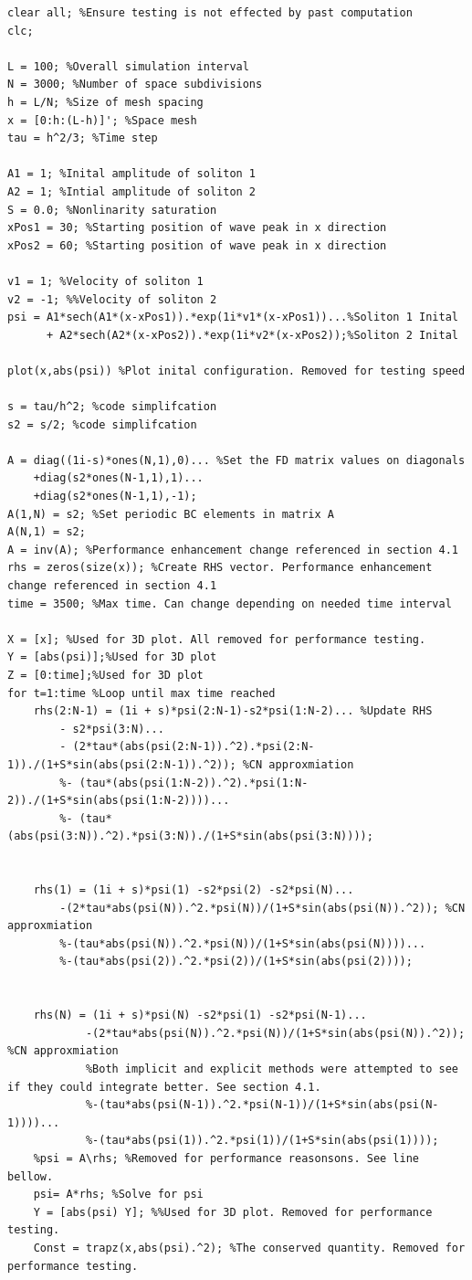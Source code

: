 \documentclass{article}
\begin{document}
\begin{lstlisting}
clear all; %Ensure testing is not effected by past computation
clc;

L = 100; %Overall simulation interval
N = 3000; %Number of space subdivisions
h = L/N; %Size of mesh spacing
x = [0:h:(L-h)]'; %Space mesh
tau = h^2/3; %Time step

A1 = 1; %Inital amplitude of soliton 1
A2 = 1; %Intial amplitude of soliton 2
S = 0.0; %Nonlinarity saturation
xPos1 = 30; %Starting position of wave peak in x direction
xPos2 = 60; %Starting position of wave peak in x direction

v1 = 1; %Velocity of soliton 1
v2 = -1; %%Velocity of soliton 2
psi = A1*sech(A1*(x-xPos1)).*exp(1i*v1*(x-xPos1))...%Soliton 1 Inital
      + A2*sech(A2*(x-xPos2)).*exp(1i*v2*(x-xPos2));%Soliton 2 Inital

plot(x,abs(psi)) %Plot inital configuration. Removed for testing speed

s = tau/h^2; %code simplifcation
s2 = s/2; %code simplifcation

A = diag((1i-s)*ones(N,1),0)... %Set the FD matrix values on diagonals
    +diag(s2*ones(N-1,1),1)...
    +diag(s2*ones(N-1,1),-1);
A(1,N) = s2; %Set periodic BC elements in matrix A
A(N,1) = s2; 
A = inv(A); %Performance enhancement change referenced in section 4.1
rhs = zeros(size(x)); %Create RHS vector. Performance enhancement change referenced in section 4.1
time = 3500; %Max time. Can change depending on needed time interval

X = [x]; %Used for 3D plot. All removed for performance testing. 
Y = [abs(psi)];%Used for 3D plot
Z = [0:time];%Used for 3D plot
for t=1:time %Loop until max time reached   
    rhs(2:N-1) = (1i + s)*psi(2:N-1)-s2*psi(1:N-2)... %Update RHS
        - s2*psi(3:N)...
        - (2*tau*(abs(psi(2:N-1)).^2).*psi(2:N-1))./(1+S*sin(abs(psi(2:N-1)).^2)); %CN approxmiation
        %- (tau*(abs(psi(1:N-2)).^2).*psi(1:N-2))./(1+S*sin(abs(psi(1:N-2))))...
        %- (tau*(abs(psi(3:N)).^2).*psi(3:N))./(1+S*sin(abs(psi(3:N))));
        
    
    rhs(1) = (1i + s)*psi(1) -s2*psi(2) -s2*psi(N)...
        -(2*tau*abs(psi(N)).^2.*psi(N))/(1+S*sin(abs(psi(N)).^2)); %CN approxmiation
        %-(tau*abs(psi(N)).^2.*psi(N))/(1+S*sin(abs(psi(N))))...
        %-(tau*abs(psi(2)).^2.*psi(2))/(1+S*sin(abs(psi(2))));
        
    
    rhs(N) = (1i + s)*psi(N) -s2*psi(1) -s2*psi(N-1)...
            -(2*tau*abs(psi(N)).^2.*psi(N))/(1+S*sin(abs(psi(N)).^2)); %CN approxmiation
            %Both implicit and explicit methods were attempted to see if they could integrate better. See section 4.1. 
            %-(tau*abs(psi(N-1)).^2.*psi(N-1))/(1+S*sin(abs(psi(N-1))))... 
            %-(tau*abs(psi(1)).^2.*psi(1))/(1+S*sin(abs(psi(1))));
    %psi = A\rhs; %Removed for performance reasonsons. See line bellow. 
    psi= A*rhs; %Solve for psi
    Y = [abs(psi) Y]; %%Used for 3D plot. Removed for performance testing.
    Const = trapz(x,abs(psi).^2); %The conserved quantity. Removed for performance testing.
    

\end{lstlisting}
\end{document}
